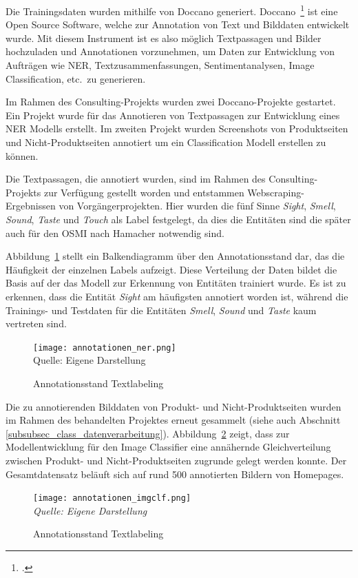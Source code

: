 Die Trainingsdaten wurden mithilfe von Doccano generiert.
Doccano~\footcite[\vglf][]{doccano-2018} ist eine Open Source Software, welche zur Annotation von Text und Bilddaten entwickelt wurde.
Mit diesem Instrument ist es also möglich Textpassagen und Bilder hochzuladen und Annotationen vorzunehmen, um Daten zur
Entwicklung von Aufträgen wie \acl{NER}, Textzusammenfassungen, Sentimentanalysen, Image Classification, etc.\ zu generieren.

Im Rahmen des Consulting-Projekts wurden zwei Doccano-Projekte gestartet.
Ein Projekt wurde für das Annotieren von Textpassagen zur Entwicklung eines \acl{NER} Modells erstellt.
Im zweiten Projekt wurden Screenshots von Produktseiten und Nicht-Produktseiten annotiert um ein Classification Modell erstellen zu können.

Die Textpassagen, die annotiert wurden, sind im Rahmen des Consulting-Projekts zur Verfügung gestellt worden und entstammen
Webscraping-Ergebnissen von Vorgängerprojekten.
Hier wurden die fünf Sinne \textit{Sight}, \textit{Smell}, \textit{Sound}, \textit{Taste} und \textit{Touch} als Label festgelegt, da dies die Entitäten sind die später auch für den OSMI nach Hamacher notwendig sind.

Abbildung~\ref{fig:annotation_ner} stellt ein Balkendiagramm über den Annotationsstand dar, das die Häufigkeit der einzelnen Labels aufzeigt. Diese Verteilung der Daten bildet die Basis auf der das Modell zur Erkennung von Entitäten trainiert wurde.
Es ist zu erkennen, dass die Entität \textit{Sight} am häufigsten annotiert worden ist, während die Trainings- und Testdaten für
die Entitäten \textit{Smell}, \textit{Sound} und \textit{Taste} kaum vertreten sind.
\begin{figure}[H]
	\caption{Annotationsstand Textlabeling}\label{fig:annotation_ner}
	\texttt{[image: annotationen\_ner.png]}
	\\
	Quelle: Eigene Darstellung
\end{figure}

Die zu annotierenden Bilddaten von Produkt- und Nicht-Produktseiten wurden im Rahmen des behandelten Projektes erneut gesammelt (siehe auch Abschnitt \ref{subsubsec_class_datenverarbeitung}).
Abbildung~\ref{fig:annotation_imgclf} zeigt, dass zur Modellentwicklung für den Image Classifier eine annähernde Gleichverteilung zwischen Produkt-
und Nicht-Produktseiten zugrunde gelegt werden konnte.
Der Gesamtdatensatz beläuft sich auf rund 500 annotierten Bildern von Homepages.
\begin{figure}[H]
	\caption{Annotationsstand Textlabeling}\label{fig:annotation_imgclf}
	\texttt{[image: annotationen\_imgclf.png]}
	\\
	\textit{Quelle: Eigene Darstellung}
\end{figure}


